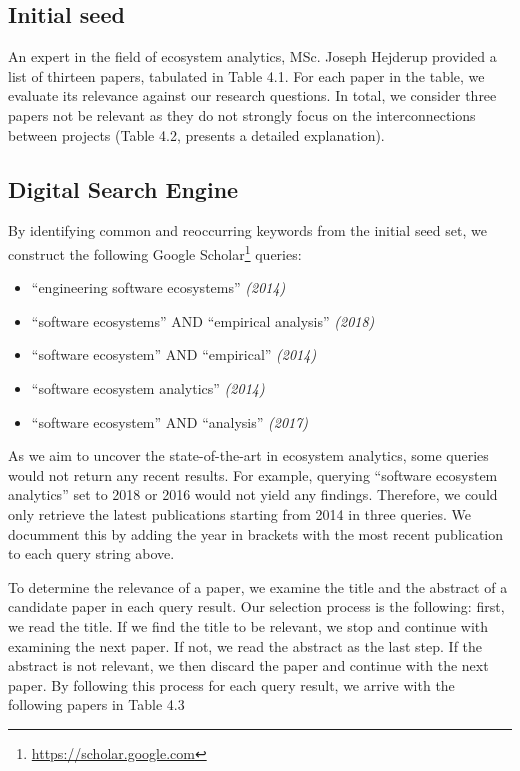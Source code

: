 \documentclass[]{book}
\providecommand{\tightlist}{%
  \setlength{\itemsep}{0pt}\setlength{\parskip}{0pt}}
\let\rmarkdownfootnote\footnote%
\def\footnote{\protect\rmarkdownfootnote}
\begin{document}
\subsection{Initial seed}\label{initial-seed}

An expert in the field of ecosystem analytics, MSc. Joseph Hejderup
provided a list of thirteen papers, tabulated in Table 4.1. For each
paper in the table, we evaluate its relevance against our research
questions. In total, we consider three papers not be relevant as they do
not strongly focus on the interconnections between projects (Table 4.2,
presents a detailed explanation).

\subsection{Digital Search Engine}\label{digital-search-engine}

By identifying common and reoccurring keywords from the initial seed
set, we construct the following Google Scholar\footnote{\url{https://scholar.google.com}}
queries:

\begin{itemize}
\tightlist
\item
  ``engineering software ecosystems'' \emph{(2014)}
\item
  ``software ecosystems'' AND ``empirical analysis'' \emph{(2018)}
\item
  ``software ecosystem'' AND ``empirical'' \emph{(2014)}
\item
  ``software ecosystem analytics'' \emph{(2014)}
\item
  ``software ecosystem'' AND ``analysis'' \emph{(2017)}
\end{itemize}

As we aim to uncover the state-of-the-art in ecosystem analytics, some
queries would not return any recent results. For example, querying
``software ecosystem analytics'' set to 2018 or 2016 would not yield any
findings. Therefore, we could only retrieve the latest publications
starting from 2014 in three queries. We documment this by adding the
year in brackets with the most recent publication to each query string
above.

To determine the relevance of a paper, we examine the title and the
abstract of a candidate paper in each query result. Our selection
process is the following: first, we read the title. If we find the title
to be relevant, we stop and continue with examining the next paper. If
not, we read the abstract as the last step. If the abstract is not
relevant, we then discard the paper and continue with the next paper. By
following this process for each query result, we arrive with the
following papers in Table 4.3
\end{document}
